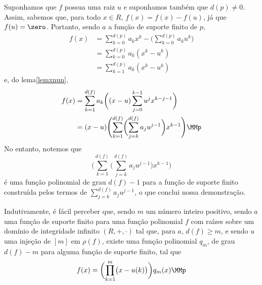 \begin{Funções polinomiais}
\begin{dem}
  Suponhamos que $f$ possua uma raiz $u$ e suponhamos também que
  $d(p)\neq 0$. Assim,
  sabemos que, para todo $x\in R$,
  $f(x)=f(x)-f(u)$, já que $f(u)=\zero$. Portanto, sendo $a$ a função de
  suporte finito de $p$,
  \begin{equation*}
    \begin{aligned}
      f(x) &= \sum_{k=0}^{d(p)} a_kx^k
              - \biggl(\sum_{k=0}^{d(p)} a_ku^k\biggr) \\
           &= \sum_{k=0}^{d(p)} a_k(x^k-u^k)\\
           &= \sum_{k=1}^{d(p)} a_k(x^k-u^k)
    \end{aligned}
  \end{equation*}
  e, do lema\xspace\ref{lemxnun},
  \begin{equation*}
    \begin{aligned}
      f(x) &= \sum_{k=1}^{d(f)} a_k\biggl(
              (x-u)\sum_{j=0}^{k-1}u^jx^{k-j-1}
              \biggr)\\
           &= (x-u)\Biggl(\sum_{k=1}^{d(f)}
                \biggl(\sum_{j=k}^{d(f)}a_ju^{j-1}\biggr)
                x^{k-1}\Biggr)\MMp
    \end{aligned}
  \end{equation*}
  No entanto, notemos que
  \begin{equation*}
    \Biggl(\sum_{k=1}^{d(f)}
                \biggl(\sum_{j=k}^{d(f)}a_ju^{j-1}\biggr)
                x^{k-1}\Biggr)
  \end{equation*}
  é uma função polinomial de grau $d(f)-1$ para a função de suporte
  finito construída pelos termos de $\sum_{j=k}^{d(f)}a_ju^{j-1}$,
  o que conclui nossa demonstração.
\end{dem}

\begin{Obs}\label{obsdecompfx}
  Indutivamente, é fácil perceber que,
  sendo $m$ um número inteiro positivo,
  sendo $a$ uma função de suporte finito para uma função polinomial $f$
  com raízes sobre um domínio de integridade
  infinito $(R,+,\cdot)$ tal que, para $a$,
  $d(f)\geq m$, e sendo $u$ uma injeção de $[m]$ em $\rho(f)$,
  existe uma função polinomial $q_m$,
  de grau $d(f)-m$ para alguma função de suporte finito, tal que
  \begin{equation*}
    f(x) = \biggl(\prod_{k=1}^m \bigl(x-u(k)\bigr)\biggr)q_m(x)\MMp
  \end{equation*}
\end{Obs}


\end{Funções polinomiais}
